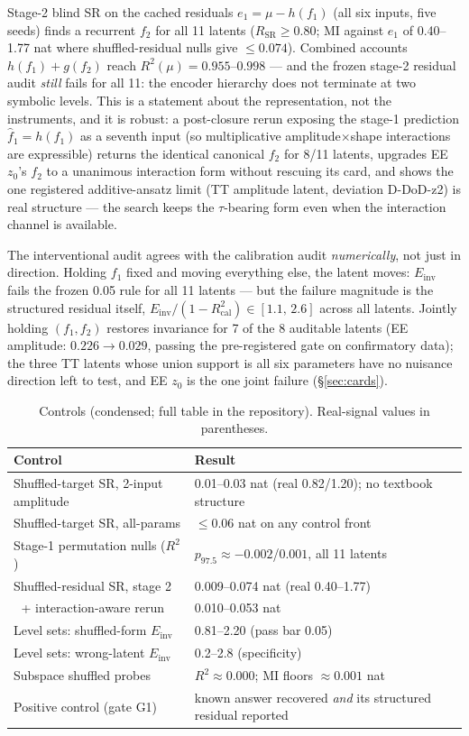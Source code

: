 \documentclass[twocolumn,10pt]{article}
\newcommand{\Einv}{E_\mathrm{inv}}
\newcommand{\RSR}{R_\mathrm{SR}}
\begin{document}
Stage-2 blind SR on the cached residuals $e_1=\mu-h(f_1)$ (all six inputs,
five seeds) finds a recurrent $f_2$ for all 11 latents ($\RSR\ge0.80$; MI
against $e_1$ of 0.40--1.77 nat where shuffled-residual nulls give
$\le0.074$). Combined accounts $h(f_1)+g(f_2)$ reach $R^2(\mu)=0.955$--$0.998$
--- and the frozen stage-2 residual audit \emph{still} fails for all 11: the
encoder hierarchy does not terminate at two symbolic levels. This is a
statement about the representation, not the instruments, and it is robust: a
post-closure rerun exposing the stage-1 prediction $\hat f_1=h(f_1)$ as a
seventh input (so multiplicative amplitude$\times$shape interactions are
expressible) returns the identical canonical $f_2$ for 8/11 latents, upgrades
EE $z_0$'s $f_2$ to a unanimous interaction form without rescuing its card,
and shows the one registered additive-ansatz limit (TT amplitude latent,
deviation D-DoD-z2) is real structure --- the search keeps the $\tau$-bearing
form even when the interaction channel is available.

The interventional audit agrees with the calibration audit \emph{numerically},
not just in direction. Holding $f_1$ fixed and moving everything else, the
latent moves: $\Einv$ fails the frozen 0.05 rule for all 11 latents --- but
the failure magnitude is the structured residual itself,
$\Einv/(1-R^2_\mathrm{cal})\in[1.1,\,2.6]$ across all latents. Jointly holding
$(f_1,f_2)$ restores invariance for 7 of the 8 auditable latents (EE amplitude:
$0.226\to0.029$, passing the pre-registered gate on confirmatory data); the
three TT latents whose union support is all six parameters have no nuisance
direction left to test, and EE $z_0$ is the one joint failure
(\S\ref{sec:cards}).

\begin{table}[t]
\centering\small
\caption{Controls (condensed; full table in the repository). Real-signal
values in parentheses.}
\label{tab:controls}
\begin{tabular}{@{}p{4.55cm}p{3.15cm}@{}}
\toprule
Control & Result \\
\midrule
Shuffled-target SR, 2-input amplitude & 0.01--0.03 nat (real 0.82/1.20); no
textbook structure \\
Shuffled-target SR, all-params & $\le0.06$ nat on any control front \\
Stage-1 permutation nulls ($R^2$) & $p_{97.5}\approx-0.002$/$0.001$, all 11
latents \\
Shuffled-residual SR, stage 2 & 0.009--0.074 nat (real 0.40--1.77) \\
$\;$ + interaction-aware rerun & 0.010--0.053 nat \\
Level sets: shuffled-form $\Einv$ & 0.81--2.20 (pass bar 0.05) \\
Level sets: wrong-latent $\Einv$ & 0.2--2.8 (specificity) \\
Subspace shuffled probes & $R^2\approx0.000$; MI floors $\approx0.001$ nat \\
Positive control (gate G1) & known answer recovered \emph{and} its structured
residual reported \\
\bottomrule
\end{tabular}
\end{table}
\end{document}

